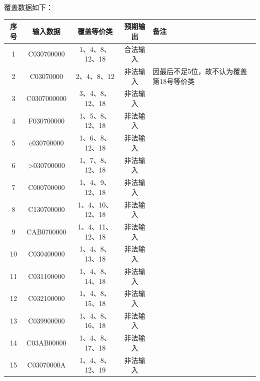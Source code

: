 \documentclass{article}
\begin{document}
\begin{enumerate}[label=\arabic*.]
        覆盖数据如下： \\
        \scalebox{0.8}
        {
            \begin{tabular}{|c|c|c|c|p{}|}
                \hline
                序号 & 输入数据 & 覆盖等价类 & 预期输出 & 备注 \\
                \hline
                1 & C030700000 & 1、4、8、12、18 & 合法输入 & ~ \\
                \hline
                2 & C03070000 & 2、4、8、12 & 非法输入 & 因最后不足5位，故不认为覆盖第18号等价类 \\
                \hline
                3 & C0307000000 & 3、4、8、12、18 & 非法输入 & ~ \\
                \hline
                4 & F030700000 & 1、5、8、12、18 & 非法输入 & ~ \\
                \hline
                5 & c030700000 & 1、6、8、12、18 & 非法输入 & ~ \\
                \hline
                6 & >030700000 & 1、7、8、12、18 & 非法输入 & ~ \\
                \hline
                7 & C000700000 & 1、4、9、12、18 & 非法输入 & ~ \\
                \hline
                8 & C130700000 & 1、4、10、12、18 & 非法输入 & ~ \\
                \hline
                9 & CAB0700000 & 1、4、11、12、18 & 非法输入 & ~ \\
                \hline
                10 & C030400000 & 1、4、8、13、18 & 非法输入 & ~ \\
                \hline
                11 & C031100000 & 1、4、8、14、18 & 非法输入 & ~ \\
                \hline
                12 & C032100000 & 1、4、8、15、18 & 非法输入 & ~ \\
                \hline
                13 & C039900000 & 1、4、8、16、18 & 非法输入 & ~ \\
                \hline
                14 & C03AB00000 & 1、4、8、17、18 & 非法输入 & ~ \\
                \hline
                15 & C03070000A & 1、4、8、12、19 & 非法输入 & ~ \\
                \hline
            \end{tabular}
        }
        

\end{enumerate}
\end{document}
